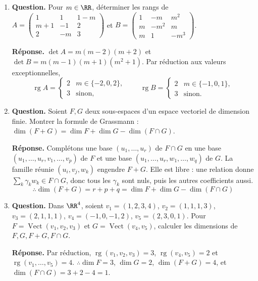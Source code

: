 \documentclass[12pt, a4paper]{article}
\begin{document}
\begin{enumerate}[label=6.\arabic*., start=105]
  \item \begin{minipage}[t]{\linewidth}\raggedright
\textbf{Question.} Pour $m\in\RR$, déterminer les rangs de $\displaystyle A=\begin{pmatrix}1&1&1-m\\m+1&-1&2\\2&-m&3\end{pmatrix}$ et $\displaystyle B=\begin{pmatrix}1&-m&m^2\\m&-m^2&m\\m&1&-m^3\end{pmatrix}$.
\par\smallskip
\textbf{Réponse.} $\det A=m(m-2)(m+2)$ et $\det B=m(m-1)(m+1)(m^2+1)$.
    Par réduction aux valeurs exceptionnelles,
    \[
      \operatorname{rg}A=\begin{cases}2&m\in\{-2,0,2\},\\3&\text{sinon,}\end{cases}\qquad
      \operatorname{rg}B=\begin{cases}2&m\in\{-1,0,1\},\\3&\text{sinon.}\end{cases}
    \]
\end{minipage}

  \item \begin{minipage}[t]{\linewidth}\raggedright
\textbf{Question.} Soient $F,G$ deux sous-espaces d’un espace vectoriel de dimension finie. Montrer la formule de Grassmann : $\dim(F+G)=\dim F+\dim G-\dim(F\cap G)$.
\par\smallskip
\textbf{Réponse.} Complétons une base $(u_1,\ldots,u_r)$ de $F\cap G$ en une base
    $(u_1,\ldots,u_r,v_1,\ldots,v_p)$ de $F$ et une base $(u_1,\ldots,u_r,w_1,\ldots,w_q)$ de $G$.
    La famille réunie $(u_i,v_j,w_k)$ engendre $F+G$.
    Elle est libre : une relation donne $\sum_k\gamma_kw_k\in F\cap G$, donc tous les $\gamma_k$ sont nuls, puis les autres coefficients aussi.
    \[
      \therefore\dim(F+G)=r+p+q=\dim F+\dim G-\dim(F\cap G)
    \]
\end{minipage}

  \item \begin{minipage}[t]{\linewidth}\raggedright
\textbf{Question.} Dans $\RR^4$, soient $v_1=(1,2,3,4)$, $v_2=(1,1,1,3)$, $v_3=(2,1,1,1)$, $v_4=(-1,0,-1,2)$, $v_5=(2,3,0,1)$. Pour $F=\operatorname{Vect}(v_1,v_2,v_3)$ et $G=\operatorname{Vect}(v_4,v_5)$, calculer les dimensions de $F,G,F+G,F\cap G$.
\par\smallskip
\textbf{Réponse.} Par réduction, $\operatorname{rg}(v_1,v_2,v_3)=3$, $\operatorname{rg}(v_4,v_5)=2$ et $\operatorname{rg}(v_1,\ldots,v_5)=4$.
    $\therefore\dim F=3$, $\dim G=2$, $\dim(F+G)=4$, et $\dim(F\cap G)=3+2-4=1$.
\end{minipage}


\end{enumerate}
\end{document}
